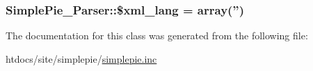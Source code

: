 \hypertarget{class_simple_pie___parser_abe93880463a69f025fbba6298f521174}{
\subsubsection[{\$xml\-\_\-lang}]{\setlength{\rightskip}{0pt plus 5cm}Simple\-Pie\-\_\-\-Parser\-::\$xml\-\_\-lang = array('')}}\label{class_simple_pie___parser_abe93880463a69f025fbba6298f521174}


The documentation for this class was generated from the following file\-:\begin{DoxyCompactItemize}
\item 
htdocs/site/simplepie/\hyperlink{simplepie_8inc}{simplepie.\-inc}\end{DoxyCompactItemize}
